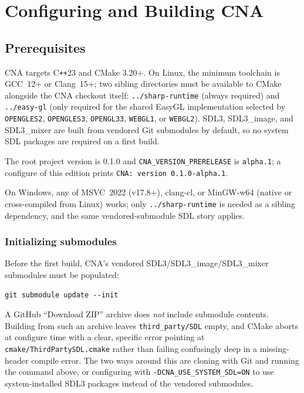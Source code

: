 \chapter{Configuring and Building CNA}
\label{ch:configuring-building}
\label{ch:building-cna}

\section{Prerequisites}

CNA targets C\texttt{++}23 and CMake 3.20+. On Linux, the minimum toolchain is GCC~12+ or
Clang~15+; two sibling directories must be available to CMake alongside the CNA checkout
itself: \texttt{../sharp-runtime} (always required) and \texttt{../easy-gl} (only required
for the shared EasyGL implementation selected by \texttt{OPENGLES2}, \texttt{OPENGLES3},
\texttt{OPENGL33}, \texttt{WEBGL1}, or \texttt{WEBGL2}). SDL3, SDL3\_image, and SDL3\_mixer are built from
vendored Git submodules by default, so no system SDL packages are required on a first build.

The root project version is 0.1.0 and \texttt{CNA\_VERSION\_PRERELEASE} is
\texttt{alpha.1}; a configure of this edition prints \texttt{CNA: version 0.1.0-alpha.1}.

On Windows, any of MSVC~2022 (v17.8+), clang-cl, or MinGW-w64 (native or cross-compiled from
Linux) works; only \texttt{../sharp-runtime} is needed as a sibling dependency, and the same
vendored-submodule SDL story applies.

\subsection{Initializing submodules}

Before the first build, CNA's vendored SDL3/SDL3\_image/SDL3\_mixer submodules must be
populated:

\begin{lstlisting}[style=cnashell]
git submodule update --init
\end{lstlisting}

A GitHub ``Download ZIP'' archive does \emph{not} include submodule contents. Building from
such an archive leaves \texttt{third\_party/SDL} empty, and CMake aborts at configure time
with a clear, specific error pointing at \texttt{cmake/ThirdPartySDL.cmake} rather than
failing confusingly deep in a missing-header compile error. The two ways around this are
cloning with Git and running the command above, or configuring with
\texttt{-DCNA\_USE\_SYSTEM\_SDL=ON} to use system-installed SDL3 packages instead of the
vendored submodules.

